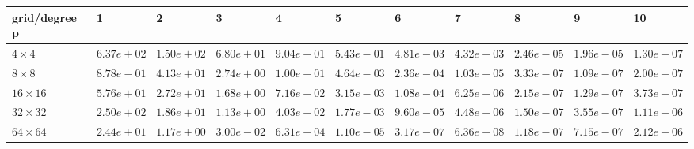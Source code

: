 \begin{tabular}{lllllllllll}
\hline
 grid/degree p   & 1          & 2          & 3          & 4          & 5          & 6          & 7          & 8          & 9          & 10         \\
\hline
 $4 \times 4$    & $6.37e+02$ & $1.50e+02$ & $6.80e+01$ & $9.04e-01$ & $5.43e-01$ & $4.81e-03$ & $4.32e-03$ & $2.46e-05$ & $1.96e-05$ & $1.30e-07$ \\
 $8 \times 8$    & $8.78e-01$ & $4.13e+01$ & $2.74e+00$ & $1.00e-01$ & $4.64e-03$ & $2.36e-04$ & $1.03e-05$ & $3.33e-07$ & $1.09e-07$ & $2.00e-07$ \\
 $16 \times 16$  & $5.76e+01$ & $2.72e+01$ & $1.68e+00$ & $7.16e-02$ & $3.15e-03$ & $1.08e-04$ & $6.25e-06$ & $2.15e-07$ & $1.29e-07$ & $3.73e-07$ \\
 $32 \times 32$  & $2.50e+02$ & $1.86e+01$ & $1.13e+00$ & $4.03e-02$ & $1.77e-03$ & $9.60e-05$ & $4.48e-06$ & $1.50e-07$ & $3.55e-07$ & $1.11e-06$ \\
 $64 \times 64$  & $2.44e+01$ & $1.17e+00$ & $3.00e-02$ & $6.31e-04$ & $1.10e-05$ & $3.17e-07$ & $6.36e-08$ & $1.18e-07$ & $7.15e-07$ & $2.12e-06$ \\
\hline
\end{tabular}